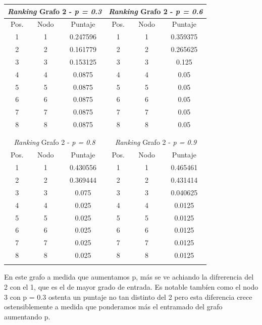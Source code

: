 \begin{center}
         \begin{tabular}{|c|c|c||c|c|c|}
                    \hline
                    \multicolumn{3}{|c||}{\emph{Ranking} Grafo 2 - \emph{p = 0.3}} & \multicolumn{3}{c|}{\emph{Ranking} Grafo 2 - \emph{p = 0.6}} \\ \hline
                    Pos. & Nodo & Puntaje    & Pos. & Nodo & Puntaje  \\ \hline
1 & 1 &  0.247596 & 1 & 1 & 0.359375 \\ 
2 & 2 &  0.161779 & 2 & 2 & 0.265625 \\
3 & 3 &  0.153125  & 3 & 3 & 0.125 \\
4 & 4 &  0.0875  & 4 & 4 &  0.05 \\
5 & 5 &  0.0875  & 5 & 5 &  0.05 \\
6 & 6 &  0.0875  & 6 & 6 &  0.05 \\
7 & 7 &  0.0875  & 7 & 7 &  0.05 \\
8 & 8 &  0.0875  & 8 & 8 &  0.05 \\
 \\ \hline
                    \multicolumn{6}{c}{} \\ \hline
                    \multicolumn{3}{|c||}{\emph{Ranking} Grafo 2 - \emph{p = 0.8}} & \multicolumn{3}{c|}{\emph{Ranking} Grafo 2 - \emph{p = 0.9}} \\ \hline
                    Pos. & Nodo & Puntaje    & Pos. & Nodo & Puntaje  \\ \hline
1 & 1 & 0.430556 & 1 & 1 & 0.465461 \\ 
2 & 2 & 0.369444 & 2 & 2 & 0.431414 \\
3 & 3 & 0.075  & 3 & 3 & 0.040625 \\
4 & 4 & 0.025  & 4 & 4 & 0.0125 \\
5 & 5 & 0.025  & 5 & 5 & 0.0125 \\
6 & 6 & 0.025  & 6 & 6 & 0.0125 \\
7 & 7 & 0.025  & 7 & 7 & 0.0125 \\
8 & 8 & 0.025  & 8 & 8 & 0.0125 \\

 \\ \hline

                \end{tabular}
            \end{center}
   
En este grafo a medida que aumentamos p, más se ve achiando la difrerencia del 2 con el 1, que es el de mayor grado de entrada. Es notable tambíen como el nodo 3 con p = 0.3 ostenta un puntaje no tan distinto del 2 pero esta diferencia crece ostensiblemente a medida que ponderamos más el entramado del grafo aumentando p. \\

